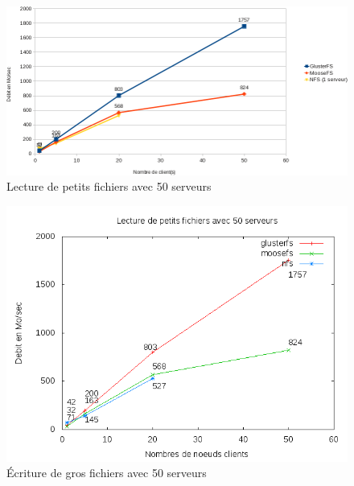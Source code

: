 \documentclass[12pt]{report}
\begin{document}
		        \begin{figure}[H]
			        \begin{center}
				        \includegraphics[width=1\linewidth]{graph/calc/50RS.png}
				        \caption{Lecture de petits fichiers avec 50 serveurs}
			        \end{center}
		        \end{figure}
\begin{figure}[H]
\begin{center}
\includegraphics[bb=0 0 640 480,width=14cm]{images/srv50rs.png}
\caption{Écriture de gros fichiers avec 50 serveurs}
\end{center}
\end{figure} 
\end{document}
